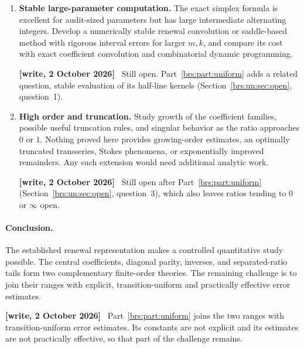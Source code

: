 \documentclass[11pt]{article}
\numberwithin{equation}{section}
\theoremstyle{remark}\newtheorem{remark}[theorem]{Remark}
\newenvironment{writenote}{\par\smallskip\begingroup\small\noindent\textbf{[write, 2 October 2026]}\ }{\par\endgroup\smallskip}
\begin{document}
\begin{enumerate}[leftmargin=*,itemsep=0.7em]
\begin{writenote}
Still open after Part~\ref{brs:part:uniform}, whose constants are also existential (its open question~2 in Section~\ref{brs:un:sec:open}).
\end{writenote}

\item \textbf{Stable large-parameter computation.}
The exact simplex formula is excellent for audit-sized parameters but
has large intermediate alternating integers.  Develop a numerically
stable renewal convolution or saddle-based method with rigorous
interval errors for larger $m,k$, and compare its cost with exact
coefficient convolution and combinatorial dynamic programming.

\begin{writenote}
Still open. Part~\ref{brs:part:uniform} adds a related question, stable evaluation of its half-line kernels (Section~\ref{brs:un:sec:open}, question~1).
\end{writenote}

\item \textbf{High order and truncation.}
Study growth of the coefficient families, possible useful truncation
rules, and singular behavior as the ratio approaches $0$ or $1$.
Nothing proved here provides growing-order estimates, an optimally
truncated transseries, Stokes phenomena, or exponentially improved
remainders.  Any such extension would need additional analytic work.

\begin{writenote}
Still open after Part~\ref{brs:part:uniform} (Section~\ref{brs:un:sec:open}, question~3), which also leaves ratios tending to $0$ or $\infty$ open.
\end{writenote}
\end{enumerate}

\paragraph{Conclusion.}
The established renewal representation makes a controlled quantitative
study possible.  The central coefficients, diagonal parity, inverses,
and separated-ratio tails form two complementary finite-order theories.
The remaining challenge is to join their ranges with explicit,
transition-uniform and practically effective error estimates.

\begin{writenote}
Part~\ref{brs:part:uniform} joins the two ranges with transition-uniform error estimates. Its constants are not explicit and its estimates are not practically effective, so that part of the challenge remains.
\end{writenote}
\end{document}
